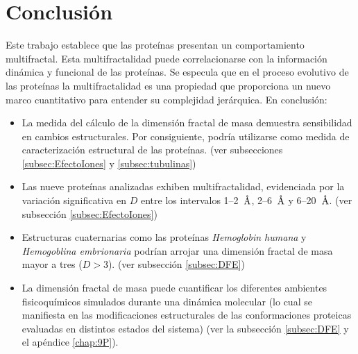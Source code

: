 \chapter{Conclusi\'{o}n}


Este trabajo establece que las prote\'{i}nas presentan un comportamiento multifractal. Esta multifractalidad puede correlacionarse con la informaci\'{o}n din\'{a}mica y funcional de las prote\'{i}nas. Se especula que en el proceso evolutivo de las prote\'{i}nas la multifractalidad es una propiedad que proporciona un nuevo marco cuantitativo para entender su complejidad jer\'{a}rquica. En conclusi\'{o}n:


\begin{itemize}
	\item La medida del c\'{a}lculo de la dimensi\'{o}n fractal de masa demuestra sensibilidad en
	 cambios estructurales. Por consiguiente, podr\'{i}a utilizarse como medida de caracterizaci\'{o}n estructural de las prote\'{i}nas. (ver subsecciones \ref{subsec:EfectoIones} y \ref{subsec:tubulinas})
	
	\item Las nueve prote\'{i}nas analizadas exhiben multifractalidad, evidenciada por la variaci\'{o}n 
	significativa en $D$ entre los intervalos 1--2~$\textup{\r{A}}$, 2--6~$\textup{\r{A}}$ y 6--20~$\textup{\r{A}}$. (ver subsección \ref{subsec:EfectoIones})
	
	\item Estructuras cuaternarias como las prote\'{i}nas \textit{Hemoglobin humana} y \textit{Hemogoblina embrionaria} podr\'{i}an arrojar una dimensi\'{o}n fractal de masa mayor a tres ($D>3$). (ver subsección \ref{subsec:DFE})
	
	
	\item La dimensi\'{o}n fractal de masa puede cuantificar los diferentes ambientes fisicoqu\'{i}micos simulados durante una din\'{a}mica molecular (lo cual se manifiesta en las modificaciones estructurales de las conformaciones proteicas evaluadas en distintos estados del sistema) (ver la subsección \ref{subsec:DFE} y el apéndice \ref{chap:9P}).
	
 \color{black}
 
\end{itemize}



